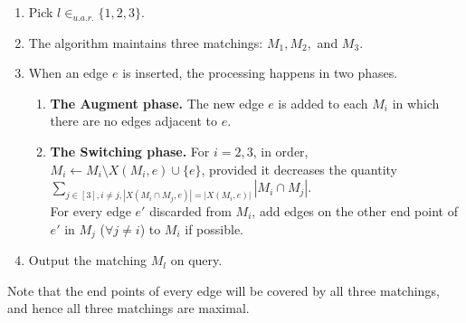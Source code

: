 \documentclass[11pt]{article}
\begin{document}
   \begin{algorithm}[H]
   \caption{Randomized Algorithm for MCM}\label{alg_rand2}
   \begin{enumerate}
    \item Pick $l \in_{u.a.r.} \{1,2,3\}$.
    \item The algorithm maintains three matchings: $M_1,M_2,$ and $M_3$.
    \item When an edge $e$ is inserted, the processing happens in two phases.
   \begin{enumerate}
	   \item {\bf The Augment phase.} The new edge $e$
		   is added to each $M_i$ in which there are no 
		   edges  adjacent to $e$.
	   \item {\bf The Switching phase.}
		   For $i=2,3$, in order, $M_i\gets M_i\setminus X(M_i,e)\cup \{e\}$, provided it decreases the quantity 
 		   $\sum_{j\in[3],i\neq j, |X(M_i\cap M_j,e)| = |X(M_i,e)|}|M_i\cap M_j|$.\\
		   For every edge $e'$ discarded from $M_i$, add edges on the other end point of $e'$ in $M_j$ ($\forall j\neq i$) to $M_i$ if possible.
   \end{enumerate}
   \item Output the matching $M_l$ on query.
   \end{enumerate}
 \end{algorithm}
 
 Note that the end points of every edge will be covered by all three matchings, and hence all three matchings are maximal. 
 
\end{document}
